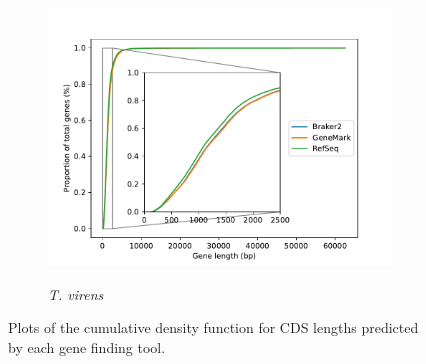 \begin{figure}[ht]
  \ContinuedFloat
  \centering
    \begin{subfigure}{0.8\textwidth}
      \includegraphics[width=\textwidth]{figures/t-virens-gene-cdf.pdf}
      \label{fig:tvirens-lengths}
      \caption{\textit{T. virens}}
    \end{subfigure}
  \label{fig:cdf-lengths}
  \caption[Cumulative Density Function of Gene Lengths]{Plots of the
    cumulative density function for CDS lengths predicted by each gene
    finding tool.}
\end{figure}
